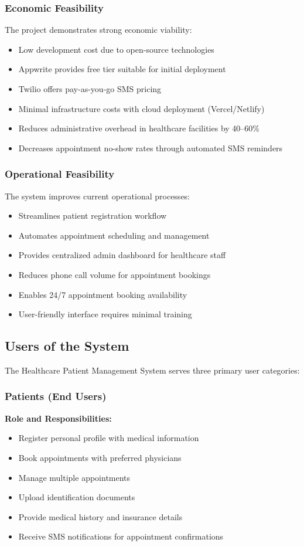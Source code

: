 \documentclass[11pt,a4paper]{article}
\begin{document}
\subsubsection{Economic Feasibility}
The project demonstrates strong economic viability:
\begin{itemize}
    \item Low development cost due to open-source technologies
    \item Appwrite provides free tier suitable for initial deployment
    \item Twilio offers pay-as-you-go SMS pricing
    \item Minimal infrastructure costs with cloud deployment (Vercel/Netlify)
    \item Reduces administrative overhead in healthcare facilities by 40--60\%
    \item Decreases appointment no-show rates through automated SMS reminders
\end{itemize}

\subsubsection{Operational Feasibility}
The system improves current operational processes:
\begin{itemize}
    \item Streamlines patient registration workflow
    \item Automates appointment scheduling and management
    \item Provides centralized admin dashboard for healthcare staff
    \item Reduces phone call volume for appointment bookings
    \item Enables 24/7 appointment booking availability
    \item User-friendly interface requires minimal training
\end{itemize}

\subsection{Users of the System}

The Healthcare Patient Management System serves three primary user categories:

\subsubsection{Patients (End Users)}
\textbf{Role and Responsibilities:}
\begin{itemize}
    \item Register personal profile with medical information
    \item Book appointments with preferred physicians
    \item Manage multiple appointments
    \item Upload identification documents
    \item Provide medical history and insurance details
    \item Receive SMS notifications for appointment confirmations
\end{itemize}
\end{document}
